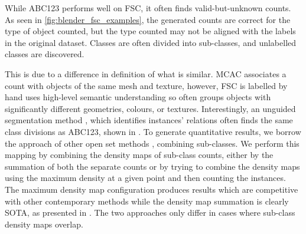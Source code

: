 \documentclass[runningheads]{llncs}
\begin{document}
While ABC123 performs well on FSC, it often finds valid-but-unknown counts. As seen in \cref{fig:blender_fsc_examples}, the generated counts are correct for the type of object counted, but the type counted may not be aligned with the labels in the original dataset. Classes are often divided into sub-classes, and unlabelled classes are discovered.

This is due to a difference in definition of what is similar. MCAC associates a count with objects of the same mesh and texture, however, FSC is labelled by hand uses high-level semantic understanding so often groups objects with significantly different geometries, colours, or textures. 
Interestingly, an unguided segmentation method \cite{kirillov2023segany}, which identifies instances' relations often finds the same class divisions as ABC123, shown in .
To generate quantitative results, we borrow the approach of other open set methods \cite{ma2023can, hobley2023dms, kirillov2023segany}, combining sub-classes. 
We perform this mapping by combining the density maps of sub-class counts, either by the summation of both the separate counts or by trying to combine the density maps using the maximum density at a given point and then counting the instances. The maximum density map configuration produces results which are competitive with other contemporary methods while the density map summation is clearly SOTA, as presented in . The two approaches only differ in cases where sub-class density maps overlap. 
\end{document}
